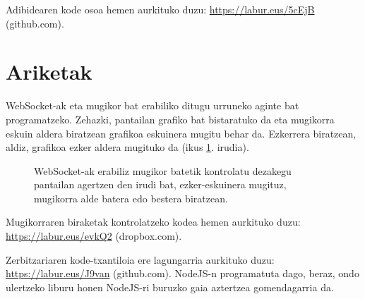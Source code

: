Adibidearen kode osoa hemen aurkituko duzu:
\href{https://gist.github.com/juananpe/06df4742dae0cc01351089b5bed4c641}{https://labur.eus/5cEjB} (github.com).

\section{Ariketak}
WebSocket-ak eta mugikor bat erabiliko ditugu urruneko aginte bat programatzeko. Zehazki, pantailan grafiko bat bistaratuko da eta mugikorra eskuin aldera biratzean grafikoa eskuinera mugitu behar da. Ezkerrera biratzean, aldiz, grafikoa ezker aldera mugituko da (ikus \ref{fig:websocketariketa}. irudia).

\begin{figure}[ht]
	\centering
{}
\caption{WebSocket-ak erabiliz mugikor batetik kontrolatu dezakegu pantailan agertzen den irudi bat, ezker-eskuinera mugituz, mugikorra alde batera edo bestera biratzean.}
\label{fig:websocketariketa}
\end{figure}

Mugikorraren biraketak kontrolatzeko kodea hemen aurkituko duzu:\newline
\href{https://www.dropbox.com/s/dh81ca4f9isb44g/sockets\_mobile.zip?dl=1}{https://labur.eus/evkQ2} (dropbox.com).

Zerbitzariaren kode-txantiloia ere lagungarria aurkituko duzu: \href{https://gist.github.com/juananpe/6c27962e19163adb1bd145298d9ec611}{https://labur.eus/J9van} (github.com). NodeJS-n programatuta dago, beraz, ondo ulertzeko liburu honen NodeJS-ri buruzko gaia aztertzea gomendagarria da.